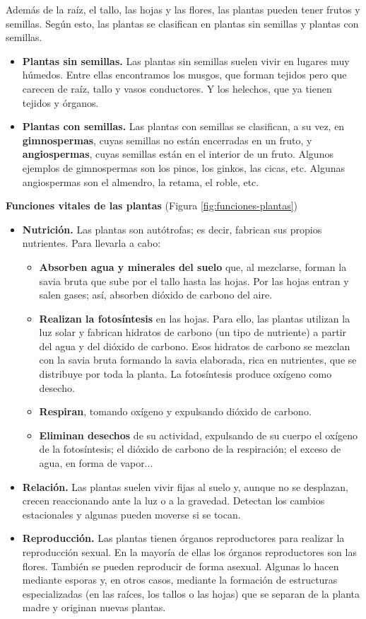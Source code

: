 \vspace{3mm}
Además de la raíz, el tallo, las hojas y las flores, las plantas pueden tener frutos y semillas. Según esto, las plantas se clasifican en plantas sin semillas y plantas con semillas.
\begin{itemize}
    \item \textbf{Plantas sin semillas.} Las plantas sin semillas suelen vivir en lugares muy húmedos. Entre ellas encontramos los musgos, que forman tejidos pero que carecen de raíz, tallo y vasos conductores. Y los helechos, que ya tienen tejidos y órganos.
    \item \textbf{Plantas con semillas.} Las plantas con semillas se clasifican, a su vez, en \textbf{gimnospermas}, cuyas semillas no están encerradas en un fruto, y \textbf{angiospermas}, cuyas semillas están en el interior de un fruto. Algunos ejemplos de gimnospermas son los pinos, los ginkos, las cicas, etc. Algunas angiospermas son el almendro, la retama, el roble, etc.
\end{itemize}

\textbf{Funciones vitales de las plantas} (Figura \ref{fig:funciones-plantas})
\begin{itemize}
    \item \textbf{Nutrición.} Las plantas son autótrofas; es decir, fabrican sus propios nutrientes. Para llevarla a cabo:
    \begin{itemize}
        \item \textbf{Absorben agua y minerales del suelo} que, al mezclarse, forman la savia bruta que sube por el tallo hasta las hojas. Por las hojas entran y salen gases; así, absorben dióxido de carbono del aire.
        \item \textbf{Realizan la fotosíntesis} en las hojas. Para ello, las plantas utilizan la luz solar y fabrican hidratos de carbono (un tipo de nutriente) a partir del agua y del dióxido de carbono. Esos hidratos de carbono se mezclan con la savia bruta formando la savia elaborada, rica en nutrientes, que se distribuye por toda la planta. La fotosíntesis produce oxígeno como desecho.
        \item \textbf{Respiran}, tomando oxígeno y expulsando dióxido de carbono.
        \item \textbf{Eliminan desechos} de su actividad, expulsando de su cuerpo el oxígeno de la fotosíntesis; el dióxido de carbono de la respiración; el exceso de agua, en forma de vapor...
    \end{itemize}
    \item \textbf{Relación.} Las plantas suelen vivir fijas al suelo y, aunque no se desplazan, crecen reaccionando ante la luz o a la gravedad. Detectan los cambios estacionales y algunas pueden moverse si se tocan.
    \item \textbf{Reproducción.} Las plantas tienen órganos reproductores para realizar la reproducción sexual. En la mayoría de ellas los órganos reproductores son las flores. También se pueden reproducir de forma asexual. Algunas lo hacen mediante esporas y, en otros casos, mediante la formación de estructuras especializadas (en las raíces, los tallos o las hojas) que se separan de la planta madre y originan nuevas plantas.
\end{itemize}

